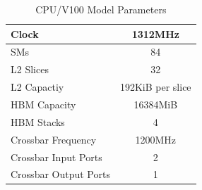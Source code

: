     \begin{table}[!htbp]
      \centering
      \setlength{\belowcaptionskip}{6pt plus 1pt minus 1pt}
      \captionsetup{width=.75\textwidth}
      \caption{CPU/V100 Model Parameters}
      \hspace{1cm}
         \begin{tabular}{|l|c|}
            \hline
            Clock                 & 1312MHz          \\ \hline
            SMs                   & 84               \\ \hline
            L2 Slices             & 32               \\ \hline
            L2 Capactiy           & 192KiB per slice \\ \hline
            HBM Capacity          & 16384MiB         \\ \hline
            HBM Stacks            & 4                \\ \hline
            Crossbar Frequency    & 1200MHz          \\ \hline
            Crossbar Input Ports  & 2                \\ \hline
            Crossbar Output Ports & 1                \\ \hline
         \end{tabular}
      \label{tab:v100_params}
   \end{table}